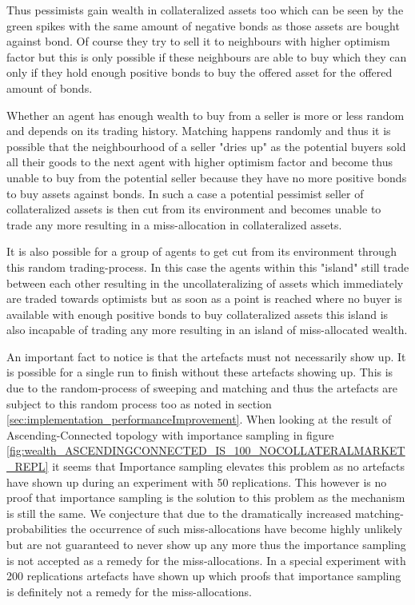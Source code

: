 \documentclass[Bachelorarbeit.tex]{subfiles}
\begin{document}
\medskip 

Thus pessimists gain wealth in collateralized assets too which can be seen by the green spikes with the same amount of negative bonds as those assets are bought against bond. Of course they try to sell it to neighbours with higher optimism factor but this is only possible if these neighbours are able to buy which they can only if they hold enough positive bonds to buy the offered asset for the offered amount of bonds.



\medskip 

Whether an agent has enough wealth to buy from a seller is more or less random and depends on its trading history. Matching happens randomly and thus it is possible that the neighbourhood of a seller "dries up" as the potential buyers sold all their goods to the next agent with higher optimism factor and become thus unable to buy from the potential seller because they have no more positive bonds to buy assets against bonds. In such a case a potential pessimist seller of collateralized assets is then cut from its environment and becomes unable to trade any more resulting in a miss-allocation in collateralized assets.

\medskip 

It is also possible for a group of agents to get cut from its environment through this random trading-process. In this case the agents within this "island" still trade between each other resulting in the uncollateralizing of assets which immediately are traded towards optimists but as soon as a point is reached where no buyer is available with enough positive bonds to buy collateralized assets this island is also incapable of trading any more resulting in an island of miss-allocated wealth.

\medskip 

An important fact to notice is that the artefacts must not necessarily show up. It is possible for a single run to finish without these artefacts showing up. This is due to the random-process of sweeping and matching and thus the artefacts are subject to this random process too as noted in section \ref{sec:implementation_performanceImprovement}. When looking at the result of Ascending-Connected topology with importance sampling in figure \ref{fig:wealth_ASCENDINGCONNECTED_IS_100_NOCOLLATERALMARKET_REPL} it seems that Importance sampling elevates this problem as no artefacts have shown up during an experiment with 50 replications. This however is no proof that importance sampling is the solution to this problem as the mechanism is still the same. We conjecture that due to the dramatically increased matching-probabilities the occurrence of such miss-allocations have become highly unlikely but are not guaranteed to never show up any more thus the importance sampling is not accepted as a remedy for the miss-allocations. In a special experiment with 200 replications artefacts have shown up which proofs that importance sampling is definitely not a remedy for the miss-allocations.
\end{document}
